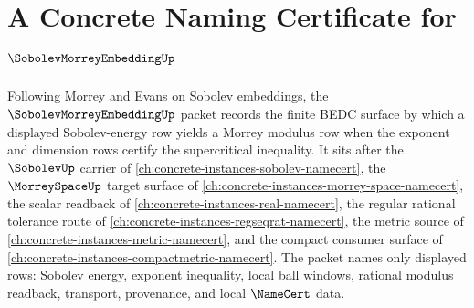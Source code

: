 \chapter{A Concrete Naming Certificate for $\SobolevMorreyEmbeddingUp$}
\label{ch:concrete-instances-sobolev-morrey-embedding-namecert}

Following Morrey and Evans on Sobolev embeddings, the $\SobolevMorreyEmbeddingUp$ packet records the finite BEDC surface by which a displayed Sobolev-energy row yields a Morrey modulus row when the exponent and dimension rows certify the supercritical inequality. It sits after the $\SobolevUp$ carrier of \autoref{ch:concrete-instances-sobolev-namecert}, the $\MorreySpaceUp$ target surface of \autoref{ch:concrete-instances-morrey-space-namecert}, the scalar readback of \autoref{ch:concrete-instances-real-namecert}, the regular rational tolerance route of \autoref{ch:concrete-instances-regseqrat-namecert}, the metric source of \autoref{ch:concrete-instances-metric-namecert}, and the compact consumer surface of \autoref{ch:concrete-instances-compactmetric-namecert}. The packet names only displayed rows: Sobolev energy, exponent inequality, local ball windows, rational modulus readback, transport, provenance, and local $\NameCert$ data.

